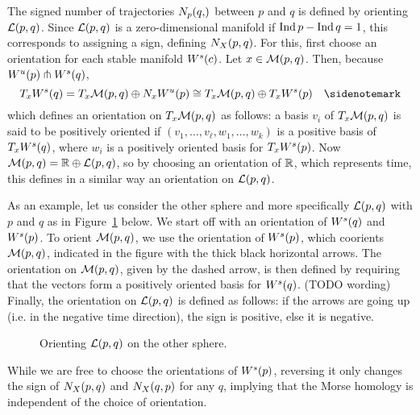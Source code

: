     The signed number of trajectories $\NX pq$ between $p$ and $q$ is defined by orienting  $\mathcal L(p, q)$. Since  $\mathcal L(p, q)$ is a zero-dimensional manifold if  $\operatorname{Ind} p - \operatorname{Ind} q = 1$, this corresponds to assigning a sign, defining  $N_{X}(p, q)$.
    For this, first choose an orientation for each stable manifold $W^s(c)$.
    Let $x \in \mathcal M(p, q)$.
    Then, because $W^u(p) \pitchfork W^s(q)$,
    \[
    T_x \stable q = T_x \traj pq \oplus N_x \unstable p  \cong
    T_x \traj pq \oplus T_x \stable p \quad \sidenotemark    \] 
    which defines an orientation on $T_x \mathcal M(p, q)$ as follows: a basis $v_i$ of $T_x \mathcal M(p, q) $ is said to be positively oriented if $(v_1, \ldots, v_\ell, w_1, \ldots, w_k)$ is a positive basis of  $T_x W^s(q)$, where $w_i$ is a positively oriented basis for $T_x W^s(p)$.
    Now $\mathcal M(p, q) = \mathbb{R} \oplus \mathcal L(p, q)$, so by choosing an orientation of $\mathbb{R}$, which represents time, this defines in a similar way an orientation on $\mathcal L(p, q)$.
    \begin{eg}
        As an example, let us consider the other sphere and more specifically $\mathcal L(p, q)$ with $p$ and  $q$ as in Figure~\ref{fig:orientation-example} below. 
        We start off with an orientation of $W^s(q)$ and  $W^s(p)$.
        To orient  $\mathcal M(p, q)$, we use the orientation of  $W^s(p)$, which coorients $\mathcal M(p, q)$, indicated in the figure with the thick black horizontal arrows.
        The orientation on $\mathcal M(p, q)$, given by the dashed arrow, is then defined by requiring that the vectors form a positively oriented basis for $W^s(q)$. (TODO wording)
        Finally, the orientation on $\mathcal L(p, q)$ is defined as follows: if the arrows are going up (i.e. in the negative time direction), the sign is positive, else it is negative.
        \begin{figure}[H]
    \centering
    \caption{
        Orienting $\mathcal L(p, q)$ on the other sphere.
    }
    \label{fig:orientation-example}
\end{figure}
    \end{eg}

    \begin{remark}
        While we are free to choose the orientations of $W^s(p)$, reversing it only changes the sign of $N_{X}(p, q)$ and  $N_{X}(q, p)$ for any $q$, implying that the Morse homology is independent of the choice of orientation.
    \end{remark}


